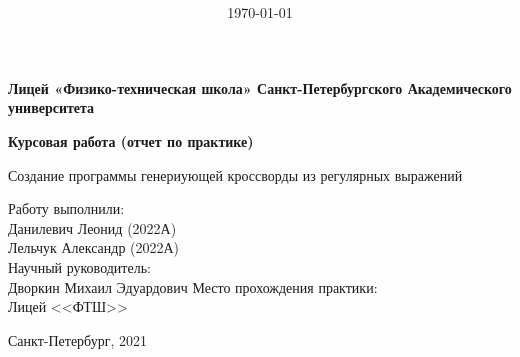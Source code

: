 \documentclass[12pt]{article}
\title{\bf \ReportTheme}
\author{\it \ReportAuthor}
\date{\today}
\begin{document}

    \begin{center}
    \large { {\bf Лицей «Физико-техническая школа»  Санкт-Петербургского Академического университета   } } 
    
    \vspace*{6\baselineskip}
    
    \large { {\bf Курсовая работа (отчет по практике) } } 
    
    \vspace*{6\baselineskip}
    
    Создание программы генериующей кроссворды из регулярных выражений \\
    \vspace*{3\baselineskip}
    
    \end{center}        
    \begin{flushright}
        Работу выполнили: \\
        Данилевич Леонид (2022А) \\
        Лельчук Александр (2022А) \\
        Научный руководитель: \\
        Дворкин Михаил Эдуардович
        Место прохождения практики: \\
        Лицей <<ФТШ>>
    \end{flushright}
    \vspace*{5\baselineskip}
    \begin{center}
        Санкт-Петербург, 2021
    \end{center}        
    \newpage %
    
    \newpage %

    \newpage %
\end{document}
